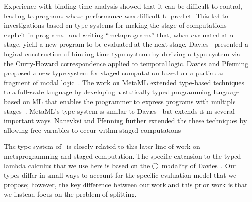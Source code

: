Experience with binding time analysis showed that it can be difficult
to control, leading to programs whose performance was difficult to
predict. This led to investigations based on type systems for making
the stage of computations explicit in
programs~\cite{GJ91-lambda,NN92-twolevel} and writing ``metaprograms''
that, when evaluated at a stage, yield a new program to be evaluated
at the next stage.
Davies~\cite{davies96} presented a
logical construction of binding-time type systems by deriving a type
system via the Curry-Howard correspondence applied to temporal logic.
Davies and Pfenning proposed a new type system for staged computation
based on a particular fragment of modal logic~\cite{DP01-modal}. The
work on MetaML extended type-based techniques to a full-scale language
by developing a statically typed programming language based on ML that
enables the programmer to express programs with multiple
stages~\cite{Taha97,taha-thesis-99}.  MetaML's type system is similar
to Davies~\cite{davies96} but extends it in several important ways.
Nanevksi and Pfenning further extended the these techniques by
allowing free variables to occur within staged
computations~\cite{NP05-nn}.

The type-system of \lang\ is closely related to this later line of
work on metaprogramming and staged computation.  The specific
extension to the typed lambda calculus that we use here is based on
the $\bigcirc$ modality of Davies~\cite{DP01-modal}.  Our types differ in
small ways to account for the specific evaluation model that we
propose; however, the key difference between our work and this prior
work is that we instead focus on the problem of splitting.
%



